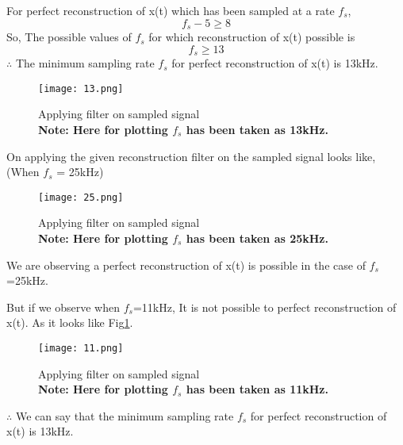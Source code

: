 \documentclass[journal,12pt,twocolumn]{IEEEtran}
\begin{document}
For perfect reconstruction of x(t) which has been sampled at a rate $f_s$, $$f_s-5 \ge 8$$
So, The possible values of $f_s$ for which reconstruction of x(t) possible is 
$$f_s \ge 13$$
$\therefore$ The minimum sampling rate $f_s$ for perfect reconstruction of x(t) is 13kHz.

\begin{figure}[!htp]
    \centering
    \texttt{[image: 13.png]}
    \caption{Applying filter on sampled signal
    \\\textbf{Note: Here for plotting $f_s$ has been taken as 13kHz.}}
\end{figure}


On applying the given reconstruction filter on the sampled signal looks like,
(When $f_s$ = 25kHz)
\begin{figure}[!htp]
    \centering
    \texttt{[image: 25.png]}
    \caption{Applying filter on sampled signal
    \\\textbf{Note: Here for plotting $f_s$ has been taken as 25kHz.}}
\end{figure}

We are observing a perfect reconstruction of x(t) is possible in the case of $f_s$=25kHz.

But if we observe when $f_s$=11kHz, It is not possible to perfect reconstruction of x(t). As it looks like Fig\ref{fig}.
\begin{figure}[!htp]
    \centering
    \texttt{[image: 11.png]}
    \caption{Applying filter on sampled signal
    \\\textbf{Note: Here for plotting $f_s$ has been taken as 11kHz.}}\label{fig}
\end{figure}

\newpage
$\therefore$ We can say that the minimum sampling rate $f_s$ for perfect reconstruction of x(t) is 13kHz.
\end{document}
